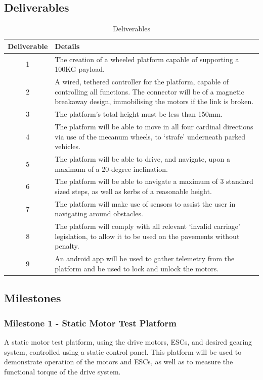 \documentclass [12pt]{article}
\begin{document}
\subsection{Deliverables}\label{sec:deliverables}

\begin{table}[H]
    \centering
    \setlength{\arrayrulewidth}{1.5pt}
    \begin{tabular}{|c| p{}|}
    \hline
    \cellcolor{gray!40}Deliverable & \cellcolor{gray!40}Details \\
    \hline
    1 & The creation of a wheeled platform capable of supporting a 100KG payload. \\
    \hline
    2 & A wired, tethered controller for the platform, capable of controlling all functions.
    The connector will be of a magnetic breakaway design, immobilising the motors if the link is broken. \\
    \hline
    3 & The platform’s total height must be less than 150mm. \\
    \hline
    4 & The platform will be able to move in all four cardinal directions via use of the mecanum wheels, to ‘strafe’ underneath parked vehicles. \\
    \hline
    5 & The platform will be able to drive, and navigate, upon a maximum of a 20-degree inclination. \\
    \hline
    6 & The platform will be able to navigate a maximum of 3 standard sized steps, as well as kerbs of a reasonable height. \\
    \hline
    7 & The platform will make use of sensors to assist the user in navigating around obstacles. \\
    \hline
    8 & The platform will comply with all relevant ‘invalid carriage’ legislation, to allow it to be used on the pavements without penalty. \\
    \hline
    9 & An android app will be used to gather telemetry from the platform and be used to lock and unlock the motors. \\
    \hline
    \end{tabular}
    \caption{Deliverables}
    \label{table:deliverables}
\end{table}

\subsection{Milestones}\label{sec:milestones}

\subsubsection{Milestone 1 - Static Motor Test Platform}
A static motor test platform, using the drive motors, ESCs, and desired gearing system, controlled using a static control panel. This platform will be used to demonstrate operation of the motors and ESCs, as well as to measure the functional torque of the drive system.
\end{document}
